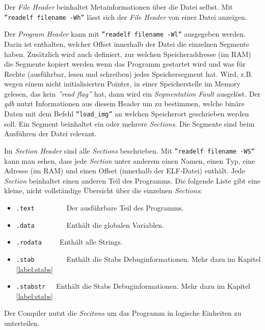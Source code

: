 


Der \textit{File Header} beinhaltet Metainformationen über die Datei selbst.
Mit \texttt{''readelf filename -Wh''} lässt sich der \textit{File Header} von einer Datei anzeigen.

Der \textit{Program Header} kann mit \texttt{''readelf filename -Wl''} ausgegeben werden. Darin ist enthalten, welcher Offset innerhalb der Datei die einzelnen Segmente haben.
Zusätzlich wird auch definiert, zur welchen Speicheraddresse (im RAM) die Segmente kopiert werden wenn das Programm gestartet wird und was für Rechte (ausführbar, lesen und schreiben) jedes Speichersegment hat.
Wird, z.B. wegen einem nicht initialisierten Pointer, in einer Speicherstelle im Memory gelesen, das kein \textit{''read flag''} hat, dann wird ein \textit{Segmentation Fault} ausgelöst.
Der \textit{gdb} nutzt Informationen aus diesem Header um zu bestimmen, welche binäre Daten mit dem Befehl \texttt{''load\_img''} an welchen Speicherort geschrieben werden soll.
Ein Segment beinhaltet ein oder mehrere \textit{Sections}.
Die Segmente sind beim Ausführen der Datei relevant.

Im \textit{Section Header} sind alle \textit{Sections} beschrieben.
Mit \texttt{''readelf filename -WS''} kann man sehen, dass jede \textit{Section} unter anderem einen Namen, einen Typ, eine Adresse (im RAM) und einen Offset (innerhalb der ELF-Datei) enthält.
Jede \textit{Section} beinhaltet einen anderen Teil des Programms.
Die folgende Liste gibt eine kleine, nicht vollständige Übersicht über die einzelnen \textit{Sections}:
\begin{itemize}
	\item \texttt{.text}\ \ \ \ \ \ \ \ \ Der ausführbare Teil des Programms.
	\item \texttt{.data}\ \ \ \ \ \ \ \ \ Enthält die globalen Variablen.
	\item \texttt{.rodata}\ \ \ \ \ Enthält alle Strings.
	\item \texttt{.stab}\ \ \ \ \ \ \ \ \ Enthält die Stabs Debuginformationen. Mehr dazu im Kapitel \ref{label:stabs} 
	\item \texttt{.stabstr}\ \ \ Enthält die Stabs Debuginformationen. Mehr dazu im Kapitel \ref{label:stabs} 
\end{itemize}
Der Compiler nutzt die \textit{Secitons} um das Programm in logische Einheiten zu unterteilen.


